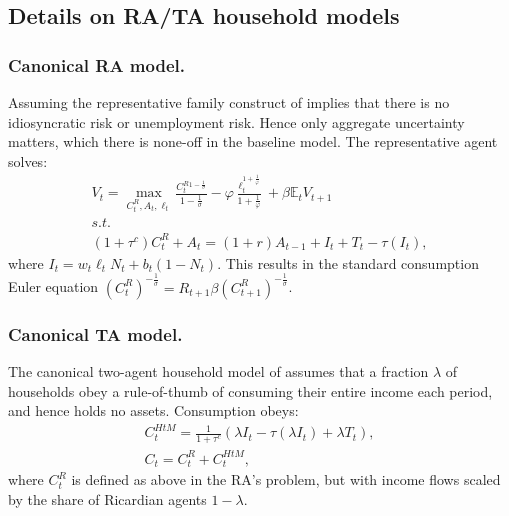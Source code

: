 \subsection{Details on RA/TA household models} \label{sec:RA_TA}
\subsubsection{Canonical RA model.}
Assuming the representative family construct of \citet{merz1995search} implies that there is no idiosyncratic risk or unemployment risk. Hence only aggregate uncertainty matters, which there is none-off in the baseline model. The representative agent solves:
\begin{gather*}
V_{t}=\max_{C_{t}^{R},A_{t},\ell_{t}}\frac{C_{t}^{R}^{1-\frac{1}{\sigma}}}{1-\frac{1}{\sigma}}-\varphi\frac{\ell_{t}^{1+\frac{1}{\varphi}}}{1+\frac{1}{\varphi}}+\beta\mathbb{E}_{t}V_{t+1} \\
s.t.\\
\left(1+\tau^{c}\right)C_{t}^{R}+A_{t}=\left(1+r\right)A_{t-1}+I_{t}+T_{t}-\tau\left(I_{t}\right),
\end{gather*}
where $I_{t}=w_{t}\ell_{t}N_{t}+b_{t}\left(1-N_{t}\right)$. This results in the standard consumption Euler equation $\left(C_{t}^{R}\right)^{-\frac{1}{\sigma}}=R_{t+1}\beta\left(C_{t+1}^{R}\right)^{-\frac{1}{\sigma}}$.

\subsubsection{Canonical TA model.}
The canonical two-agent household model of \citet{campbell1989consumption} assumes that a fraction $\lambda$ of households obey a rule-of-thumb of consuming their entire income each period, and hence holds no assets. Consumption obeys:
\begin{gather*}
C_{t}^{HtM}=\frac{1}{1+\tau^{c}}\left(\lambda I_{t}-\tau\left(\lambda I_{t}\right)+\lambda T_{t}\right), \\
C_{t}=C_{t}^{R}+C_{t}^{HtM},
\end{gather*}
where $C_{t}^{R}$ is defined as above in the RA's problem, but with income flows scaled by the share of Ricardian agents $1-\lambda$.


